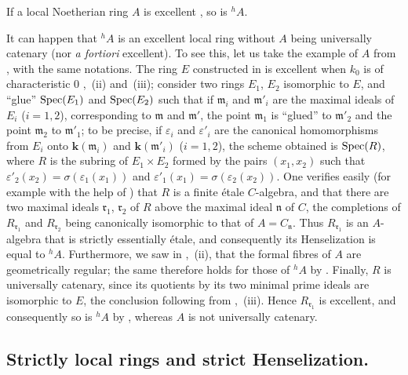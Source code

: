 \begin{corollary}[18.7.6]
\label{IV.18.7.6}
If a local Noetherian ring $A$ is excellent , so is ${}^h\!A$.
\end{corollary}

\begin{remark}[18.7.7]
\label{IV.18.7.7}
It can happen that ${}^h\!A$ is an excellent local ring without $A$ being universally catenary (nor \emph{a fortiori} excellent).
To see this, let us take the example of $A$ from , with the same notations.
The ring $E$ constructed in  is excellent when $k_0$ is of characteristic 0 ,~(ii) and~(iii);
consider two rings $E_1$, $E_2$ isomorphic to $E$, and ``glue'' $\operatorname{Spec}(E_1)$ and $\operatorname{Spec}(E_2)$ such that if $\mathfrak{m}_i$ and $\mathfrak{m}'_i$ are the maximal ideals of $E_i$ ($i=1,2$), corresponding to $\mathfrak{m}$ and $\mathfrak{m}'$, the point $\mathfrak{m}_1$ is ``glued'' to $\mathfrak{m}'_2$ and the point $\mathfrak{m}_2$ to $\mathfrak{m}'_1$;
to be precise, if $\varepsilon_i$ and $\varepsilon'_i$ are the canonical homomorphisms from $E_i$ onto $\boldsymbol{k}(\mathfrak{m}_i)$ and $\boldsymbol{k}(\mathfrak{m}'_i)$ ($i=1,2$), the scheme obtained is $\operatorname{Spec}(R)$, where $R$ is the subring of $E_1\times E_2$ formed by the pairs $(x_1,x_2)$ such that $\varepsilon'_2(x_2)=\sigma(\varepsilon_1(x_1))$ and $\varepsilon'_1(x_1)=\sigma(\varepsilon_2(x_2))$.
One verifies easily (for example with the help of ) that $R$ is a finite \'{e}tale $C$-algebra, and that there are two maximal ideals $\mathfrak{r}_1$, $\mathfrak{r}_2$ of $R$ above the maximal ideal $\mathfrak{n}$ of $C$, the completions of $R_{\mathfrak{r}_1}$ and $R_{\mathfrak{r}_2}$ being canonically isomorphic to that of $A=C_{\mathfrak{n}}$.  Thus $R_{\mathfrak{r}_1}$ is an $A$-algebra that is strictly essentially \'{e}tale, and consequently its Henselization is equal to ${}^h\!A$.
Furthermore, we saw in ,~(ii), that the formal fibres of $A$ are geometrically regular; the same therefore holds for those of ${}^h\!A$ by .  Finally, $R$ is universally catenary, since its quotients by its two minimal prime ideals are isomorphic to $E$, the conclusion following from ,~(iii).  Hence $R_{\mathfrak{r}_1}$ is excellent, and consequently so is ${}^h\!A$ by , whereas $A$ is not universally catenary.
\end{remark}


\subsection{Strictly local rings and strict Henselization.}
\label{subsection:IV.18.8}

